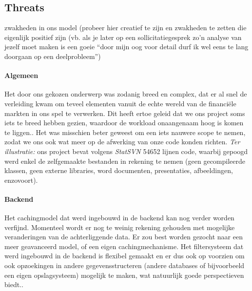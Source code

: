 \subsection{Threats}

\todo zwakheden in ons model (probeer hier creatief te zijn en zwakheden te zetten die eigenlijk positief zijn (vb. als je later op een sollicitatiegesprek zo'n analyse van jezelf moet maken is een goeie ``door mijn oog voor detail durf ik wel eens te lang doorgaan op een deelprobleem'')

\paragraph{Algemeen} Het door ons gekozen onderwerp was zodanig breed en complex, dat er al snel de verleiding kwam om teveel elementen vanuit de echte wereld van de financi\"ele markten in ons spel te verwerken. Dit heeft ertoe geleid dat we ons project soms iets te breed hebben gezien, waardoor de workload onaangenaam hoog is komen te liggen.. Het was misschien beter geweest om een iets nauwere scope te nemen, zodat we ons ook wat meer op de afwerking van onze code konden richten.
\emph{Ter illustratie: }ons project bevat volgens \emph{StatSVN} 54652 lijnen code, waarbij gepoogd werd enkel de zelfgemaakte bestanden in rekening te nemen (geen gecompileerde klassen, geen externe libraries, word documenten, presentaties, afbeeldingen, enzovoort). 

\paragraph{Backend}
Het cachingmodel dat werd ingebouwd in de backend kan nog verder worden verfijnd. Momenteel wordt er nog te weinig rekening gehouden met mogelijke veranderingen van de achterliggende data. Er zou best worden gezocht naar een meer geavanceerd model, of een eigen cachingmechanisme. Het filtersysteem dat werd ingebouwd in de backend is flexibel gemaakt en er dus ook op voorzien om ook opzoekingen in andere gegevensstructeren (andere databases of bijvoorbeeld een eigen opslagsysteem) mogelijk te maken, wat natuurlijk goede perspectieven biedt..
